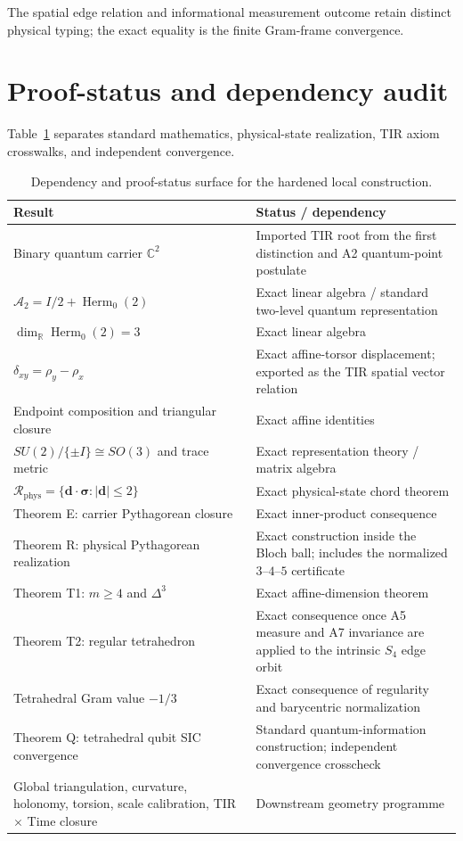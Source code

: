 \documentclass[12pt,a4paper]{article}
\newcommand{\Herm}{\operatorname{Herm}}
\newcommand{\R}{\mathbb{R}}
\newcommand{\C}{\mathbb{C}}
\newcommand{\Rphys}{\mathcal{R}_{\mathrm{phys}}}
\newcommand{\Astate}{\mathcal{A}_2}
\newcommand{\sigmavec}{\bm{\sigma}}
\newcommand{\dvec}{\bm{d}}
\begin{document}
The spatial edge relation and informational measurement outcome retain distinct physical typing; the exact equality is the finite Gram-frame convergence.

\section{Proof-status and dependency audit}

Table~\ref{tab:status} separates standard mathematics, physical-state realization, TIR axiom crosswalks, and independent convergence.

\begin{table}[htbp]
\centering
\small
\renewcommand{\arraystretch}{1.22}
\begin{tabular}{>{\raggedright\arraybackslash}p{} >{\raggedright\arraybackslash}p{}}
\toprule
\textbf{Result} & \textbf{Status / dependency}\\
\midrule
Binary quantum carrier $\C^2$ & Imported TIR root from the first distinction and A2 quantum-point postulate\\
$\Astate=I/2+\Herm_0(2)$ & Exact linear algebra / standard two-level quantum representation\\
$\dim_{\R}\Herm_0(2)=3$ & Exact linear algebra\\
$\delta_{xy}=\rho_y-\rho_x$ & Exact affine-torsor displacement; exported as the TIR spatial vector relation\\
Endpoint composition and triangular closure & Exact affine identities\\
$SU(2)/\{\pm I\}\cong SO(3)$ and trace metric & Exact representation theory / matrix algebra\\
$\Rphys=\{\dvec\cdot\sigmavec:|\dvec|\le2\}$ & Exact physical-state chord theorem\\
Theorem E: carrier Pythagorean closure & Exact inner-product consequence\\
Theorem R: physical Pythagorean realization & Exact construction inside the Bloch ball; includes the normalized $3$--$4$--$5$ certificate\\
Theorem T1: $m\ge4$ and $\Delta^3$ & Exact affine-dimension theorem\\
Theorem T2: regular tetrahedron & Exact consequence once A5 measure and A7 invariance are applied to the intrinsic $S_4$ edge orbit\\
Tetrahedral Gram value $-1/3$ & Exact consequence of regularity and barycentric normalization\\
Theorem Q: tetrahedral qubit SIC convergence & Standard quantum-information construction; independent convergence crosscheck\\
Global triangulation, curvature, holonomy, torsion, scale calibration, TIR $\times$ Time closure & Downstream geometry programme\\
\bottomrule
\end{tabular}
\caption{Dependency and proof-status surface for the hardened local construction.}
\label{tab:status}
\end{table}
\end{document}
